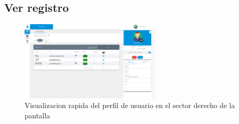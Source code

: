 \begin{itemize}
				\subsection{Ver registro}
					\begin{figure}
						\centering
							\includegraphics[width=0.6\textwidth]{Screenshots/web/usuarioVer.png}
									\caption{Visualizacion rapida del perfil de usuario en el sector derecho de la pantalla}
							\label{fig:verRegistro}
					\end{figure}

		\end{itemize}